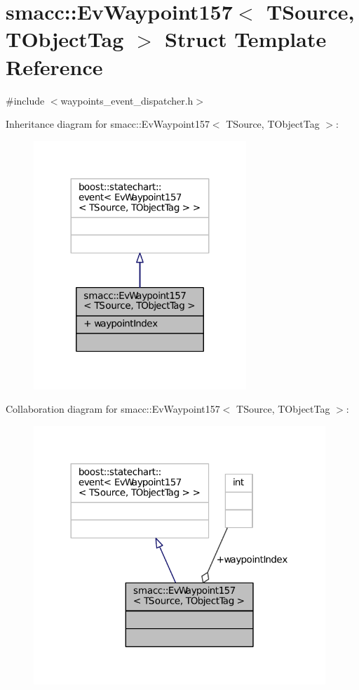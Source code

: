 \hypertarget{structsmacc_1_1EvWaypoint157}{}\section{smacc\+:\+:Ev\+Waypoint157$<$ T\+Source, T\+Object\+Tag $>$ Struct Template Reference}
\label{structsmacc_1_1EvWaypoint157}


{\ttfamily \#include $<$waypoints\+\_\+event\+\_\+dispatcher.\+h$>$}



Inheritance diagram for smacc\+:\+:Ev\+Waypoint157$<$ T\+Source, T\+Object\+Tag $>$\+:
\nopagebreak
\begin{figure}[H]
\begin{center}
\leavevmode
\includegraphics[width=227pt]{structsmacc_1_1EvWaypoint157__inherit__graph}
\end{center}
\end{figure}


Collaboration diagram for smacc\+:\+:Ev\+Waypoint157$<$ T\+Source, T\+Object\+Tag $>$\+:
\nopagebreak
\begin{figure}[H]
\begin{center}
\leavevmode
\includegraphics[width=312pt]{structsmacc_1_1EvWaypoint157__coll__graph}
\end{center}
\end{figure}
